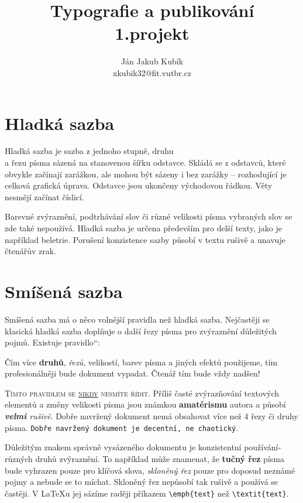 \documentclass[a4paper, 11pt, twocolumn]{article}
\title{Typografie a publikování\\ 1.projekt}
\author{Ján Jakub Kubík\\ xkubik32@fit.vutbr.cz}
\date{}
\newcommand{\myuv}[1]{\quotedblbase #1\textquotedblleft} 	%
\begin{document}
\maketitle

\section{Hladká sazba}
Hladká sazba je sazba z jednoho stupně, druhu \\a řezu pí­sma sázená na stanovenou šířku odstavce.
Skládá se z odstavců, které obvykle začínají­ za\-ráž\-kou, ale mohou být sázeny i bez 
za\-rážky – roz\-ho\-du\-jí\-­cí­ je celková grafická úprava. Odstavce jsou ukončeny východovou řádkou.
 Věty nesmějí začínat číslicí.

Barevné zvýraznění­, podtrhávání­ slov či různé velikosti písma vybraných slov se zde také 
ne\-po\-uží\-vá. Hladká sazba je určena především pro delší­ texty, jako je napří­klad beletrie. 
Porušení­ konzistence sazby působí v textu rušivě a unavuje čtenářův zrak.

\section{Smíšená sazba} 

Smíšená sazba má o něco volnější­ pravidla než hladká sazba. Nejčastěji se klasická hladká 
sazba doplňuje o další řezy pí­sma pro zvýraznění­ dů\-le\-ži\-tých pojmů. Existuje \myuv{pravidlo}:	

\begin{displayquote}Čí­m ví­ce {\textbf{druhů}, \emph{řezů}},  {\scriptsize velikostí}, 
barev pí­sma a jiných efektů použijeme, tí­m profesionálněji bude  dokument vypadat. Čtenář
tím bude vždy {\Huge nadšen!}
\end{displayquote}

\textsc{Tí­mto pravidlem se \underline{nikdy} nesmí­te ří­dit}. Příliš časté zvýrazňování textových
elementů  a změny velikosti {\tiny pí­sma} jsou {\huge známkou \textbf{amatérismu}} autora a 
působí­ \emph{\textbf{velmi} rušivě}. Dobře navržený dokument nemá obsahovat ví­ce než 4 
řezy či druhy pí­sma. \texttt{Dobře navržený dokument je decentní­, ne chaotický}.

Důležitým znakem správně vysázeného dokumentu je konzistentní použí­vání­ různých druhů zvýraznění­.
To napří­klad může znamenat, že \textbf{tuč\-ný řez} pí­sma bude vyhrazen pouze pro klíčová
slova, \emph{skloněný řez} pouze pro doposud neznámé pojmy a nebude se to míchat. Skloněný 
řez ne\-pů\-so\-bí­ tak rušivě a použí­vá se častěji. V \LaTeX u jej sází­me raději pří­kazem 
\texttt{\textbackslash emph\{text\}} než \texttt{\textbackslash textit\{text\}}.
\end{document}
